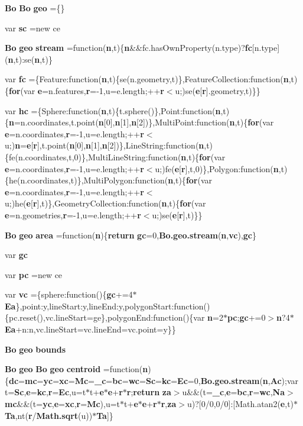 \begin{DoxyCompactItemize}
\item 
{\bf Bo} {\bf Bo} {\bf geo} =\{\}
\item 
var {\bf sc} =new ce
\item 
{\bf Bo} {\bf geo} {\bf stream} =function({\bf n},t)\{{\bf n}\&\&fc.\+has\+Own\+Property(n.\+type)?{\bf fc}[n.\+type]({\bf n},t)\+:se({\bf n},t)\}
\item 
var {\bf fc} =\{Feature\+:function({\bf n},t)\{se(n.\+geometry,t)\},Feature\+Collection\+:function({\bf n},t)\{{\bf for}(var {\bf e}=n.\+features,{\bf r}=-\/1,u=e.\+length;++{\bf r}$<$u;)se({\bf e}[{\bf r}].geometry,t)\}\}
\item 
var {\bf hc} =\{Sphere\+:function({\bf n},t)\{t.\+sphere()\},Point\+:function({\bf n},t)\{{\bf n}=n.\+coordinates,t.\+point({\bf n}[0],{\bf n}[1],{\bf n}[2])\},Multi\+Point\+:function({\bf n},t)\{{\bf for}(var {\bf e}=n.\+coordinates,{\bf r}=-\/1,u=e.\+length;++{\bf r}$<$u;){\bf n}={\bf e}[{\bf r}],t.\+point({\bf n}[0],{\bf n}[1],{\bf n}[2])\},Line\+String\+:function({\bf n},t)\{fe(n.\+coordinates,t,0)\},Multi\+Line\+String\+:function({\bf n},t)\{{\bf for}(var {\bf e}=n.\+coordinates,{\bf r}=-\/1,u=e.\+length;++{\bf r}$<$u;)fe({\bf e}[{\bf r}],t,0)\},Polygon\+:function({\bf n},t)\{he(n.\+coordinates,t)\},Multi\+Polygon\+:function({\bf n},t)\{{\bf for}(var {\bf e}=n.\+coordinates,{\bf r}=-\/1,u=e.\+length;++{\bf r}$<$u;)he({\bf e}[{\bf r}],t)\},Geometry\+Collection\+:function({\bf n},t)\{{\bf for}(var {\bf e}=n.\+geometries,{\bf r}=-\/1,u=e.\+length;++{\bf r}$<$u;)se({\bf e}[{\bf r}],t)\}\}
\item 
{\bf Bo} {\bf geo} {\bf area} =function({\bf n})\{{\bf return} {\bf gc}=0,{\bf Bo.\+geo.\+stream}({\bf n},{\bf vc}),{\bf gc}\}
\item 
var {\bf gc}
\item 
var {\bf pc} =new ce
\item 
var {\bf vc} =\{sphere\+:function()\{{\bf gc}+=4$\ast${\bf Ea}\},point\+:y,line\+Start\+:y,line\+End\+:y,polygon\+Start\+:function()\{pc.\+reset(),vc.\+line\+Start=ge\},polygon\+End\+:function()\{var {\bf n}=2$\ast${\bf pc};{\bf gc}+=0$>${\bf n}?4$\ast${\bf Ea}+n\+:n,vc.\+line\+Start=vc.\+line\+End=vc.\+point=y\}\}
\item 
{\bf Bo} {\bf geo} {\bf bounds}
\item 
{\bf Bo} {\bf geo} {\bf Bo} {\bf geo} {\bf centroid} =function({\bf n})\{{\bf dc}={\bf mc}={\bf yc}={\bf xc}={\bf Mc}={\bf \+\_\+c}={\bf bc}={\bf wc}={\bf Sc}={\bf kc}={\bf Ec}=0,{\bf Bo.\+geo.\+stream}({\bf n},{\bf Ac});var t={\bf Sc},{\bf e}={\bf kc},{\bf r}={\bf Ec},u=t$\ast$t+{\bf e}$\ast${\bf e}+{\bf r}$\ast${\bf r};{\bf return} {\bf za}$>$u\&\&(t={\bf \+\_\+c},{\bf e}={\bf bc},{\bf r}={\bf wc},{\bf Na}$>${\bf mc}\&\&(t={\bf yc},{\bf e}={\bf xc},{\bf r}={\bf Mc}),u=t$\ast$t+{\bf e}$\ast${\bf e}+{\bf r}$\ast${\bf r},{\bf za}$>$u)?[0/0,0/0]\+:[Math.\+atan2({\bf e},t)$\ast${\bf Ta},nt({\bf r}/{\bf Math.\+sqrt}(u))$\ast${\bf Ta}]\}

\end{DoxyCompactItemize}
